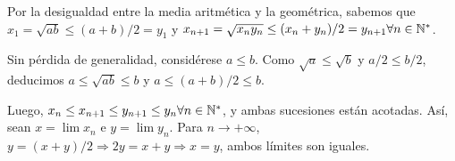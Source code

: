
Por la desigualdad entre la media aritmética y la geométrica, sabemos que $x_1 = \sqrt{ab} \leq (a+b)/2 = y_1$ y $ x_{n+1} = \sqrt{x_ny_n} \leq (x_n+y_n)/2 = y_{n+1} \forall n\in\mathbb{N}^*$.

Sin pérdida de generalidad, considérese $a\leq b$. Como $\sqrt{a}\leq\sqrt{b}$ y $a/2\leq b/2$, deducimos $a\leq\sqrt{ab}\leq b$ y $a\leq(a+b)/2\leq b$.

Luego, $x_n\leq x_{n+1}\leq y_{n+1}\leq y_n \forall n\in\mathbb{N}^*$, y ambas sucesiones están acotadas. Así, sean $x=\lim x_n$ e $y = \lim y_n$.
Para $n\to+\infty$, $y=(x+y)/2 \Rightarrow 2y=x+y \Rightarrow x=y$, ambos límites son iguales.
